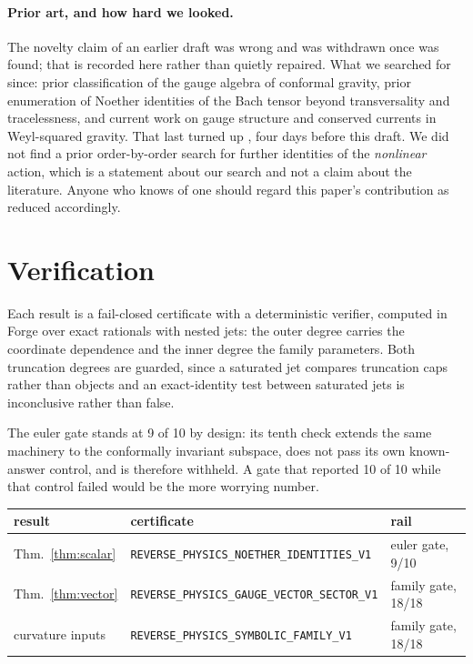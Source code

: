 \documentclass[11pt]{article}
\theoremstyle{definition}
\theoremstyle{remark}
\newcommand{\cert}[1]{\nolinkurl{#1}}
\begin{document}
\paragraph{Prior art, and how hard we looked.}
The novelty claim of an earlier draft was wrong and was withdrawn once
\cite{BoulangerHenneaux2001} was found; that is recorded here rather than
quietly repaired.  What we searched for since: prior classification of the
gauge algebra of conformal gravity, prior enumeration of Noether identities of
the Bach tensor beyond transversality and tracelessness, and current work on
gauge structure and conserved currents in Weyl-squared gravity.  That last
turned up \cite{HobsonBarkerLasenby2026}, four days before this draft.  We did
not find a prior order-by-order search for further identities of the
\emph{nonlinear} action, which is a statement about our search and not a claim
about the literature.  Anyone who knows of one should regard this paper's
contribution as reduced accordingly.

\section{Verification}
\label{sec:verification}

Each result is a fail-closed certificate with a deterministic verifier, computed
in Forge over exact rationals with nested jets: the outer degree carries the
coordinate dependence and the inner degree the family parameters.  Both
truncation degrees are guarded, since a saturated jet compares truncation caps
rather than objects and an exact-identity test between saturated jets is
inconclusive rather than false.

The euler gate stands at 9 of 10 by design: its tenth check extends the same
machinery to the conformally invariant subspace, does not pass its own
known-answer control, and is therefore withheld.  A gate that reported 10 of 10
while that control failed would be the more worrying number.

\begin{center}
\begin{tabularx}{\textwidth}{@{}lYl@{}}
\toprule
result & certificate & rail \\
\midrule
Thm.~\ref{thm:scalar} & \cert{REVERSE\_PHYSICS\_NOETHER\_IDENTITIES\_V1}   & euler gate, 9/10 \\
Thm.~\ref{thm:vector} & \cert{REVERSE\_PHYSICS\_GAUGE\_VECTOR\_SECTOR\_V1} & family gate, 18/18 \\
curvature inputs      & \cert{REVERSE\_PHYSICS\_SYMBOLIC\_FAMILY\_V1}      & family gate, 18/18 \\
\bottomrule
\end{tabularx}
\end{center}
\end{document}
